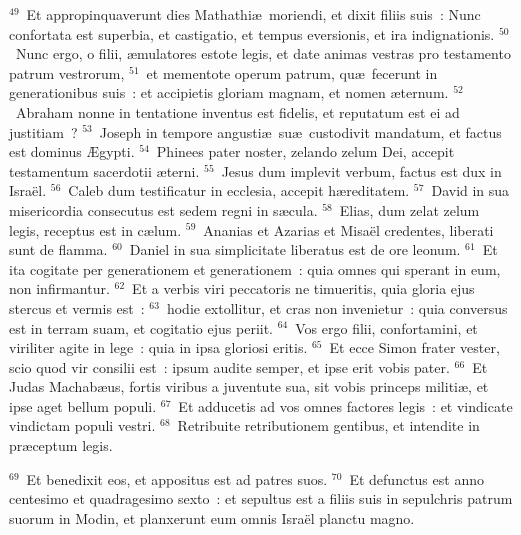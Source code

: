 ${}^{49}$~Et appropinquaverunt dies Mathathi\ae\ moriendi, et dixit filiis suis~: Nunc confortata est superbia, et castigatio, et tempus eversionis, et ira indignationis.
${}^{50}$~Nunc ergo, o filii, \ae mulatores estote legis, et date animas vestras pro testamento patrum vestrorum,
${}^{51}$~et mementote operum patrum, qu\ae\ fecerunt in generationibus suis~: et accipietis gloriam magnam, et nomen \ae ternum.
${}^{52}$~Abraham nonne in tentatione inventus est fidelis, et reputatum est ei ad justitiam~?
${}^{53}$~Joseph in tempore angusti\ae\ su\ae\ custodivit mandatum, et factus est dominus \AE gypti.
${}^{54}$~Phinees pater noster, zelando zelum Dei, accepit testamentum sacerdotii \ae terni.
${}^{55}$~Jesus dum implevit verbum, factus est dux in Isra\"el.
${}^{56}$~Caleb dum testificatur in ecclesia, accepit h\ae reditatem.
${}^{57}$~David in sua misericordia consecutus est sedem regni in s\ae cula.
${}^{58}$~Elias, dum zelat zelum legis, receptus est in c\ae lum.
${}^{59}$~Ananias et Azarias et Misa\"el credentes, liberati sunt de flamma.
${}^{60}$~Daniel in sua simplicitate liberatus est de ore leonum.
${}^{61}$~Et ita cogitate per generationem et generationem~: quia omnes qui sperant in eum, non infirmantur.
${}^{62}$~Et a verbis viri peccatoris ne timueritis, quia gloria ejus stercus et vermis est~:
${}^{63}$~hodie extollitur, et cras non invenietur~: quia conversus est in terram suam, et cogitatio ejus periit.
${}^{64}$~Vos ergo filii, confortamini, et viriliter agite in lege~: quia in ipsa gloriosi eritis.
${}^{65}$~Et ecce Simon frater vester, scio quod vir consilii est~: ipsum audite semper, et ipse erit vobis pater.
${}^{66}$~Et Judas Machab\ae us, fortis viribus a juventute sua, sit vobis princeps militi\ae , et ipse aget bellum populi.
${}^{67}$~Et adducetis ad vos omnes factores legis~: et vindicate vindictam populi vestri.
${}^{68}$~Retribuite retributionem gentibus, et intendite in pr\ae ceptum legis.


${}^{69}$~Et benedixit eos, et appositus est ad patres suos.
${}^{70}$~Et defunctus est anno centesimo et quadragesimo sexto~: et sepultus est a filiis suis in sepulchris patrum suorum in Modin, et planxerunt eum omnis Isra\"el planctu magno.

